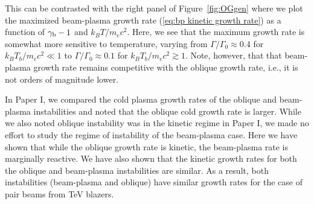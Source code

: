 \documentclass[usenatbib,iop,apj,numberedappendix]{aeb_emulateapj_2015}
\newcommand{\gammabeam}{\ensuremath{\gamma_{\rm b}}}
\begin{document}
This can be contrasted with the right panel of
  Figure~\ref{fig:OGgen} where we plot the maximized beam-plasma growth rate
(\ref{eq:bp kinetic growth rate}) as a function of $\gammabeam - 1$ and $k_B
T/m_ec^2$.  Here, we see that the maximum growth rate is somewhat more
sensitive to temperature, varying from $\Gamma/\Gamma_0 \approx 0.4$ for
$k_BT_b/m_ec^2 \ll 1$ to $\Gamma/\Gamma_0 \approx 0.1$ for $k_BT_b/m_ec^2 \gtrsim
1$.  Note, however, that that beam-plasma growth rate remains competitive with
the oblique growth rate, i.e., it is not orders of magnitude lower.

In Paper I, we compared the cold plasma growth rates of the oblique and beam-plasma instabilities and noted that the oblique cold growth rate is larger.  While we also noted oblique instability was in the kinetic regime in Paper I, we made no effort to study the regime of instability of the beam-plasma case.  Here we have shown that while the oblique growth rate is kinetic, the beam-plasma rate is marginally reactive.  We have also shown that the kinetic growth rates for both the oblique and beam-plasma instabilities are similar.  As a result, both instabilities (beam-plasma and oblique) have similar growth rates for the case of  pair beams from TeV blazers. 
\end{document}
